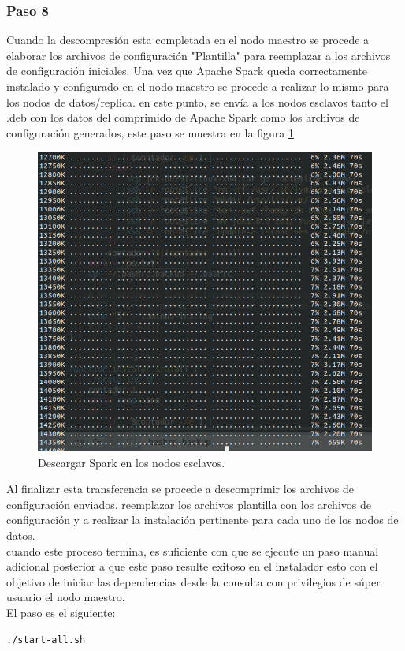 \subsubsection{Paso 8}
Cuando la descompresión esta completada en el nodo maestro se procede a elaborar los archivos de configuración "Plantilla" para reemplazar a los archivos de configuración iniciales.
Una vez que Apache Spark queda correctamente instalado y configurado en el nodo maestro se procede a realizar lo mismo para los nodos de datos/replica. en este punto, se envía a los nodos esclavos tanto el .deb con los datos del comprimido de Apache Spark como los archivos de configuración generados, este paso se muestra en la figura \ref{fig:dos}
\begin{figure}[H]
	\hypertarget{fig:dos}{\hspace{1pt}}
	\begin{center}	
		\includegraphics[width=.7\textwidth]{capitulo5/images/descargasparkesclavo.png}
		\caption{Descargar Spark en los nodos esclavos.}
		\label{fig:dos}
	\end{center}
\end{figure}
Al finalizar esta transferencia se procede a descomprimir los archivos de configuración enviados, reemplazar los archivos plantilla con los archivos de configuración y a realizar la instalación pertinente para cada uno de los nodos de datos.
\\
cuando este proceso termina, es suficiente con que se ejecute un paso manual adicional posterior a que este paso resulte exitoso en el instalador esto con el objetivo de iniciar las dependencias desde la consulta con privilegios de súper usuario el nodo maestro.\\
El paso es el siguiente:
\begin{verbatim}
./start-all.sh
\end{verbatim}
